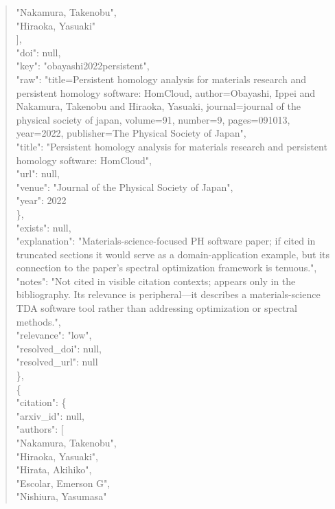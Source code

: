 \documentclass[11pt]{article}
\begin{document}
\begin{quote}
          "Nakamura, Takenobu",\\
          "Hiraoka, Yasuaki"\\
        ],\\
        "doi": null,\\
        "key": "obayashi2022persistent",\\
        "raw": "title=Persistent homology analysis for materials research and persistent homology software: HomCloud, author=Obayashi, Ippei and Nakamura, Takenobu and Hiraoka, Yasuaki, journal=journal of the physical society of japan, volume=91, number=9, pages=091013, year=2022, publisher=The Physical Society of Japan",\\
        "title": "Persistent homology analysis for materials research and persistent homology software: HomCloud",\\
        "url": null,\\
        "venue": "Journal of the Physical Society of Japan",\\
        "year": 2022\\
      \},\\
      "exists": null,\\
      "explanation": "Materials-science-focused PH software paper; if cited in truncated sections it would serve as a domain-application example, but its connection to the paper's spectral optimization framework is tenuous.",\\
      "notes": "Not cited in visible citation contexts; appears only in the bibliography. Its relevance is peripheral---it describes a materials-science TDA software tool rather than addressing optimization or spectral methods.",\\
      "relevance": "low",\\
      "resolved\_doi": null,\\
      "resolved\_url": null\\
    \},\\
    \{\\
      "citation": \{\\
        "arxiv\_id": null,\\
        "authors": [\\
          "Nakamura, Takenobu",\\
          "Hiraoka, Yasuaki",\\
          "Hirata, Akihiko",\\
          "Escolar, Emerson G",\\
          "Nishiura, Yasumasa"\\

\end{quote}
\end{document}
